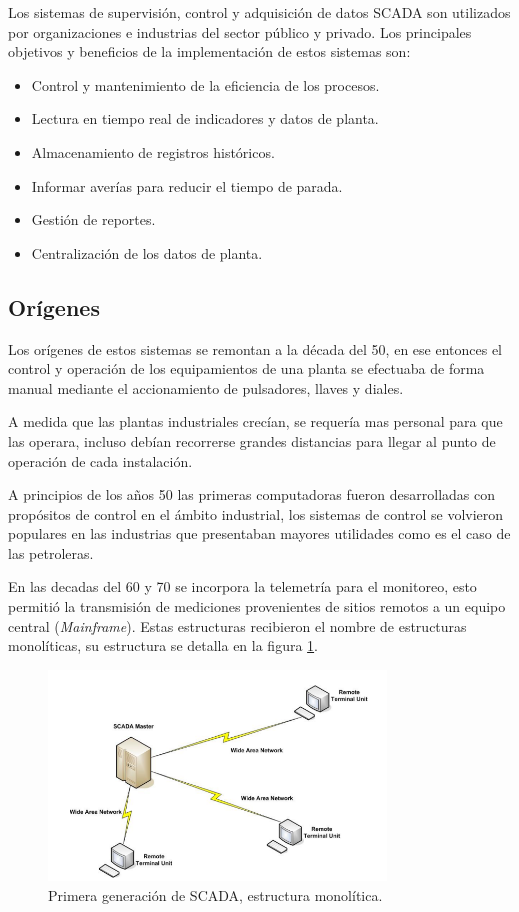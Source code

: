 Los sistemas de supervisión, control y adquisición de datos SCADA son utilizados por organizaciones e industrias del sector público y privado.
Los principales objetivos y beneficios de la implementación de estos sistemas son: 

\begin{itemize}
	\item Control y mantenimiento de la eficiencia de los procesos.
	\item Lectura en tiempo real de indicadores y datos de planta.
	\item Almacenamiento de registros históricos.
	\item Informar averías para reducir el tiempo de parada. 
	\item Gestión de reportes.
	\item Centralización de los datos de planta.
\end{itemize}

\subsection{Orígenes}

Los orígenes de estos sistemas se remontan a la década del 50, en ese entonces el control y operación de los equipamientos de una planta se efectuaba de forma manual mediante el accionamiento de pulsadores, llaves y diales.

A medida que las plantas industriales crecían, se requería mas personal para que las operara, incluso debían recorrerse grandes distancias para llegar al punto de operación de cada instalación.

A principios de los años 50 las primeras computadoras fueron desarrolladas con propósitos de control en el ámbito industrial, los sistemas de control se volvieron populares en las industrias que presentaban mayores utilidades como es el caso de las petroleras.

En las decadas del 60 y 70 se incorpora la telemetría para el monitoreo, esto permitió la transmisión de mediciones provenientes de sitios remotos a un equipo central (\textit{Mainframe}). Estas estructuras recibieron el nombre de estructuras monolíticas, su estructura se detalla en la figura \ref{fig:SCMON}.

\begin{figure}[htbp]
	\centering
	\includegraphics[width=0.8\textwidth]{./Figures/SCADA_MONOLITICO.png }
	\caption{Primera generación de SCADA, estructura monolítica.\citep{BOOK:2}}
	\label{fig:SCMON}
\end{figure}

